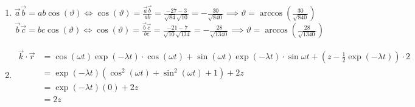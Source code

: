\documentclass{gadsescript}
\begin{document}
\begin{enumerate}[label=\alph*)]
	\item $\vec a \vec b = ab \cos(\vartheta) \iff \cos(\vartheta) =  =  = - \implies \vartheta = \arccos()$\\
		$\vec b \vec c = bc \cos(\vartheta) \iff \cos(\vartheta) =  =  = - \implies \vartheta = \arccos()$
	\item \begin{align*}
			\vec k \cdot \vec r &= \cos(\omega t)\exp(-\lambda t) \cdot \cos(\omega t) + \sin(\omega t) \exp(-\lambda t) \cdot \sin{\omega t} + \left( z - \frac{1}{2}\exp(-\lambda t) \right) \cdot 2\\
			~&= \exp(-\lambda t) \left( \cos^2(\omega t) + \sin^2(\omega t) + 1\right) + 2z\\
			~&= \exp(-\lambda t) (0) + 2z\\
			~&= 2z
	\end{align*}
\end{enumerate}
\end{document}
